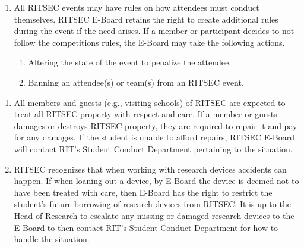 
\begin{enumerate}
      \item All RITSEC events may have rules on how attendees must conduct themselves.
            RITSEC E-Board retains the right to create additional rules during the event if
            the need arises. If a member or participant decides to not follow the
            competitions rules, the E-Board may take the following actions.
            \begin{enumerate}
                  \item Altering the state of the event to penalize the attendee.
                  \item Banning an attendee(s) or team(s) from an RITSEC event. %
            \end{enumerate}
\end{enumerate}


\begin{enumerate}
      \item All members and guests (e.g., visiting schools) of RITSEC are expected to treat
            all RITSEC property with respect and care. If a member or guests damages or
            destroys RITSEC property, they are required to repair it and pay for any
            damages. If the student is unable to afford repairs, RITSEC E-Board will
            contact RIT's Student Conduct Department pertaining to the situation.
      \item RITSEC recognizes that when working with research devices accidents can happen. If when loaning out a device, by E-Board the device is deemed not to have been treated with care, then E-Board has the right to restrict the student’s future borrowing of research devices from RITSEC. It is up to the Head of Research to escalate any missing or damaged research devices to the E-Board to then contact RIT’s Student Conduct Department for how to handle the situation. 

\end{enumerate}
